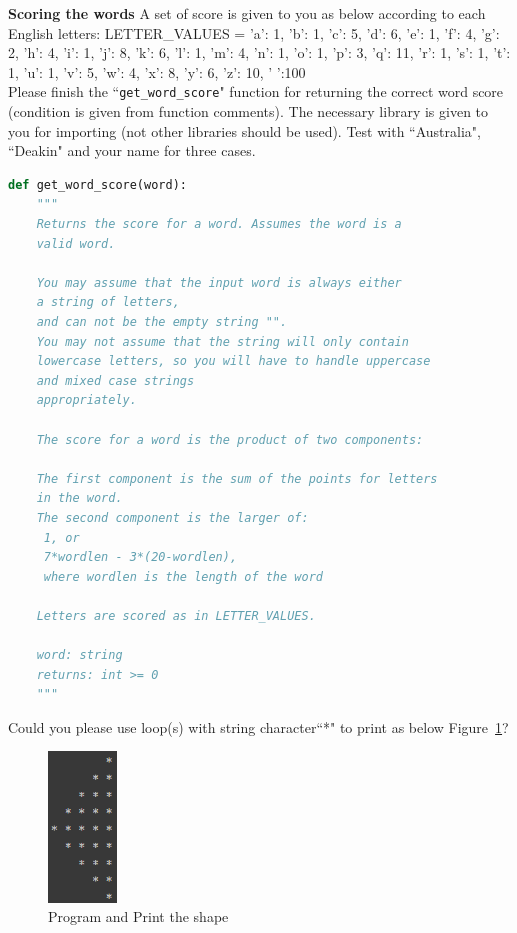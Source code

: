 \documentclass[a4paper]{article}
\begin{document}
    
    \begin{answer}[Question 1.7]
    \textbf{Scoring the words}
    A set of score is given to you as below according to each English letters: 
    LETTER_VALUES = { 'a': 1, 'b': 1, 'c': 5, 'd': 6, 'e': 1, 'f': 4, 'g': 2, 'h': 4, 'i': 1, 'j': 8, 'k': 6, 'l': 1, 'm': 4, 'n': 1, 'o': 1, 'p': 3, 'q': 11, 'r': 1, 's': 1, 't': 1, 'u': 1, 'v': 5, 'w': 4, 'x': 8, 'y': 6, 'z': 10, ' ':100 }\\

    Please finish the ``\texttt{get_word_score}" function for returning the correct word score (condition is given from function comments). The necessary library is given to you for importing (not other libraries should be used). Test with ``Australia", ``Deakin" and your name for three cases.

    \begin{lstlisting}[language=Python]
def get_word_score(word):
    """
    Returns the score for a word. Assumes the word is a
    valid word.

    You may assume that the input word is always either
    a string of letters,
    and can not be the empty string "". 
    You may not assume that the string will only contain
    lowercase letters, so you will have to handle uppercase 
    and mixed case strings
    appropriately.

    The score for a word is the product of two components:

	The first component is the sum of the points for letters 
    in the word.
	The second component is the larger of:
     1, or
     7*wordlen - 3*(20-wordlen),
     where wordlen is the length of the word

    Letters are scored as in LETTER_VALUES.

    word: string
    returns: int >= 0
    """
    \end{lstlisting}
    
    \end{answer}
    
    
    \begin{answer}[Question 1.8]
     Could you please use loop(s) with string character``*" to print as below Figure~\ref{fig:1.8q}?
     \begin{figure}[H]
        \centering
        \includegraphics[height=4cm,keepaspectratio]{figure/1.8q.png}
        \caption{Program and Print the shape}
        \label{fig:1.8q}
    \end{figure}
    \end{answer}
    
\end{document}
